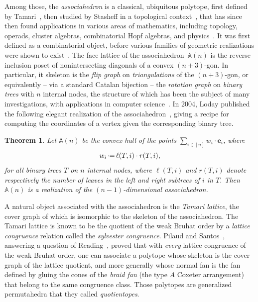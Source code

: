 \documentclass{amsart}
\newtheorem{theorem}{Theorem}%
\theoremstyle{definition}
\newcommand{\eqdef}{\mbox{\,\raisebox{0.2ex}{\scriptsize\ensuremath{\mathrm:}}\ensuremath{=}\,}} %
\newcommand{\darkblue}{\color{darkblue}} %
\newcommand{\defn}[1]{\textsl{\darkblue #1}} %
\newcommand{\polytope}[1]{\mathds{#1}} %
\newcommand{\Asso}{\polytope{A}} %
\begin{document}
Among those, the \defn{associahedron} is a classical, ubiquitous polytope, first defined by Tamari~\cite{T51}, then studied by Stasheff in a topological context~\cite{S63}, that has since then found applications in various areas of mathematics, including topology, operads, cluster algebras, combinatorial Hopf algebras, and physics~\cite{MR4675114}. It was first defined as a combinatorial object, before various families of geometric realizations were shown to exist~\cite{MR1022776,MR1941227,MR2108555,MR3437894}.
The face lattice of the associahedron~$\Asso (n)$ is the reverse inclusion poset of nonintersecting diagonals of a convex $(n+3)$-gon. In particular, it skeleton is the \defn{flip graph} on \defn{triangulations} of the $(n+3)$-gon, or equivalently -- via a standard Catalan bijection -- the \defn{rotation graph} on \defn{binary trees} with $n$ internal nodes, the structure of which has been the subject of many investigations, with applications in computer science~\cite{MR928904,MR3197650}.
In 2004, Loday published the following elegant realization of the associahedron~\cite{MR2108555}, giving a recipe for computing the coordinates of a vertex given the corresponding binary tree.

\begin{theorem}
  \label{thm:loday}
  Let $\Asso (n)$ be the convex hull of the points
  $\sum_{i\in [n]} w_i\cdot \mathbf{e}_i$, where
  \[
  w_i \eqdef \ell(T, i)\cdot r(T,i),
  \]
  for all binary trees $T$ on $n$ internal nodes, where $\ell(T,i)$ and $r(T,i)$ denote respectively the number of leaves in the left and right subtrees of $i$ in $T$.
  Then $\Asso (n)$ is a realization of the $(n-1)$-dimensional associahedron.
\end{theorem}

A natural object associated with the associahedron is the \defn{Tamari lattice}, the cover graph of which is isomorphic to the skeleton of the associahedron. The Tamari lattice is known to be the quotient of the weak Bruhat order by a \defn{lattice congruence} relation called the \defn{sylvester congruence}. Pilaud and Santos~\cite{MR3964495}, answering a question of Reading~\cite{MR2142177}, proved that with \emph{every} lattice congruence of the weak Bruhat order, one can associate a polytope whose skeleton is the cover graph of the lattice quotient, and more generally whose normal fan is the fan defined by gluing the cones of the \defn{braid fan} (the type $A$ Coxeter arrangement) that belong to the same congruence class. Those polytopes are generalized permutahedra that they called \defn{quotientopes}.
\end{document}
